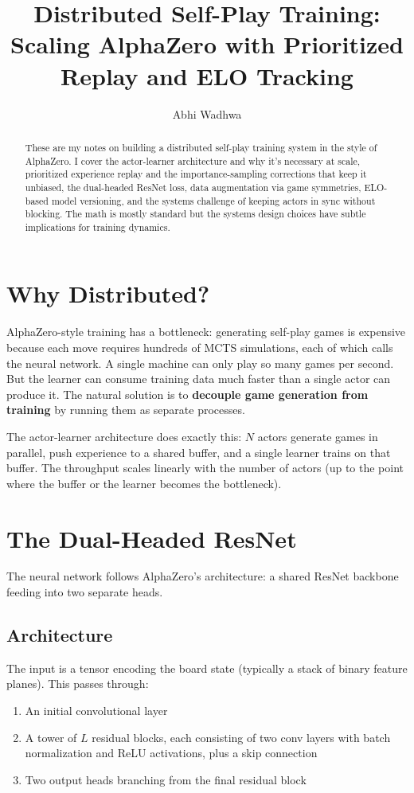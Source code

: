 \documentclass[11pt]{article}
\title{Distributed Self-Play Training:\\Scaling AlphaZero with Prioritized Replay and ELO Tracking}
\author{Abhi Wadhwa}
\date{}
\begin{document}
\maketitle

\begin{abstract}
These are my notes on building a distributed self-play training system in the style of AlphaZero. I cover the actor-learner architecture and why it's necessary at scale, prioritized experience replay and the importance-sampling corrections that keep it unbiased, the dual-headed ResNet loss, data augmentation via game symmetries, ELO-based model versioning, and the systems challenge of keeping actors in sync without blocking. The math is mostly standard but the systems design choices have subtle implications for training dynamics.
\end{abstract}

\section{Why Distributed?}

AlphaZero-style training has a bottleneck: generating self-play games is expensive because each move requires hundreds of MCTS simulations, each of which calls the neural network. A single machine can only play so many games per second. But the learner can consume training data much faster than a single actor can produce it. The natural solution is to \textbf{decouple game generation from training} by running them as separate processes.

The actor-learner architecture does exactly this: $N$ actors generate games in parallel, push experience to a shared buffer, and a single learner trains on that buffer. The throughput scales linearly with the number of actors (up to the point where the buffer or the learner becomes the bottleneck).

\section{The Dual-Headed ResNet}

The neural network follows AlphaZero's architecture: a shared ResNet backbone feeding into two separate heads.

\subsection{Architecture}

The input is a tensor encoding the board state (typically a stack of binary feature planes). This passes through:
\begin{enumerate}
\item An initial convolutional layer
\item A tower of $L$ residual blocks, each consisting of two conv layers with batch normalization and ReLU activations, plus a skip connection
\item Two output heads branching from the final residual block
\end{enumerate}
\end{document}
